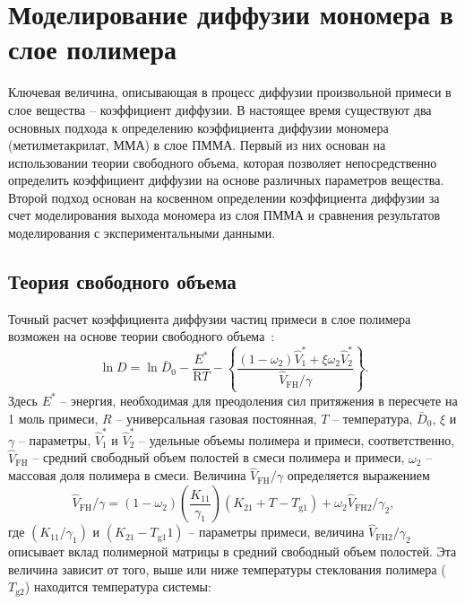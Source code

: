 \section{Моделирование диффузии мономера в слое полимера}
Ключевая величина, описывающая в процесс диффузии произвольной примеси в слое вещества -- коэффициент диффузии. В настоящее время существуют два основных подхода к определению коэффициента диффузии мономера (метилметакрилат, ММА) в слое ПММА. Первый из них основан на использовании теории свободного объема, которая позволяет непосредственно определить коэффициент диффузии на основе различных параметров вещества. Второй подход основан на косвенном определении коэффициента диффузии за счет моделирования выхода мономера из слоя ПММА и сравнения результатов моделирования с экспериментальными данными.

\subsection{Теория свободного объема}
Точный расчет коэффициента диффузии частиц примеси в слое полимера возможен на основе теории свободного объема~\cite{Vrentas_free_volume, Zielinski_free_volume}:
\begin{equation}
	\ln D=\ln \bar{D}_0-\frac{E^*}{\mathrm{R} T}-\left\{\frac{\left(1-\omega_2\right) \hat{V}_1^*+\xi \omega_2 \hat{V}_2^*}{\hat{V}_{\mathrm{FH}} / \gamma}\right\}.
\end{equation}
Здесь $E^*$ -- энергия, необходимая для преодоления сил притяжения в пересчете на 1 моль примеси, $R$ -- универсальная газовая постоянная, $T$ -- температура, $\bar{D}_0$, $\xi$ и $\gamma$ -- параметры, $\hat{V}_1^*$ и $\hat{V}_2^*$ -- удельные объемы полимера и примеси, соответственно, $\hat{V}_{\mathrm{FH}}$ -- средний свободный объем полостей в смеси полимера и примеси, $\omega_2$ -- массовая доля полимера в смеси. Величина $\hat{V}_{\mathrm{FH}} / \gamma$ определяется выражением
\begin{equation}
	\hat{V}_{\mathrm{FH}} / \gamma=\left(1-\omega_2\right)\left(\frac{K_{11}}{\gamma_1}\right)\left(K_{21}+T-T_{\mathrm{g} 1}\right)+\omega_2 \hat{V}_{\mathrm{FH} 2} / \gamma_2,
\end{equation}
где $\left(K_{11} / \gamma_1\right)$ и $\left(K_{21}-T_\mathrm{g1} 1\right)$ -- параметры примеси, величина $\hat{V}_{\mathrm{FH} 2} / \gamma_2$ описывает вклад полимерной матрицы в средний свободный объем полостей. Эта величина зависит от того, выше или ниже температуры стеклования полимера ($T_\mathrm{g2}$) находится температура системы:
